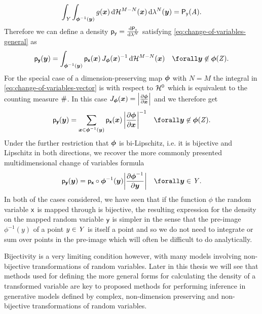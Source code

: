 \begin{equation}\label{eq:change-of-var-real-vector-derivation-3}
  \int_{\set{Y}} \int_{\vct{\phi}^{-1}(\vct{y})} g(\vct{x}) \,\dr\haum{M-N}(\vct{x})\,\dr\lebm{N}(\vct{y})
  = \prob{\rvar{y}}(\set{A}).
\end{equation}
Therefore we can define a density $\pden{\rvar{y}} = \td{\prob{\rvar{y}}}{\lebm{N}}$ satisfying \eqref{eq:change-of-variables-general} as
\begin{equation}\label{eq:change-of-variables-vector}
  \pden{\rvct{y}}(\vct{y}) = 
  \int_{\vct{\phi}^{-1}(\vct{y})} 
    \pden{\rvct{x}}(\vct{x})\,J_{\vct{\phi}}(\vct{x})^{-1}
  \,\dr\haum{M-N}(\vct{x})
  \quad \forall \vct{y} \not\in \vct{\phi}(\set{Z}).
\end{equation}
For the special case of a dimension-preserving map $\boldsymbol{\phi}$ with $N = M$ the integral in \eqref{eq:change-of-variables-vector} is with respect to $\haum{0}$ which is equivalent to the counting measure $\#$. In this case $J_{\vct{\phi}}(\vct{x}) = \left|\pd{\vct{\phi}}{\vct{x}}\right|$ and we therefore get
\begin{equation}\label{eq:change-of-variables-vector-same-dim}
  \pden{\rvct{y}}(\vct{y}) = 
  \sum_{\vct{x} \in \vct{\phi}^{-1}(\vct{y})} 
    \pden{\rvct{x}}(\vct{x}) \, \left| \pd{\vct{\phi}}{\vct{x}} \right|^{-1}
  \quad \forall \vct{y} \not\in \vct{\phi}(\set{Z}).
\end{equation}
Under the further restriction that $\boldsymbol{\phi}$ is bi-Lipschitz, i.e. it is bijective and Lipschitz in both directions, we recover the more commonly presented multidimensional change of variables formula
\begin{equation}\label{eq:change-of-variables-vector-bijective}
  \pden{\rvct{y}}(\vct{y}) = 
    \pden{\rvct{x}}\circ\vct{\phi}^{-1}(\vct{y})
    \left|\pd{\vct{\phi}^{-1}}{\vct{y}}\right|
  \quad \forall \vct{y} \in \set{Y}.
\end{equation}
In both of the cases considered, we have seen that if the function $\phi$ the random variable $\mathsf{x}$ is mapped through is bijective, the resulting expression for the density on the mapped random variable $\mathsf{y}$ is simpler in the sense that the pre-image $\phi^{-1}(y)$ of a point $y \in \mathit{Y}$ is itself a point and so we do not need to integrate or sum over points in the pre-image which will often be difficult to do analytically. 

Bijectivity is a very limiting condition however, with many models involving non-bijective transformations of random variables. Later in this thesis we will see that methods used for defining the more general forms for calculating the density of a transformed variable are key to proposed methods for performing inference in generative models defined by complex, non-dimension preserving and non-bijective transformations of random variables.

